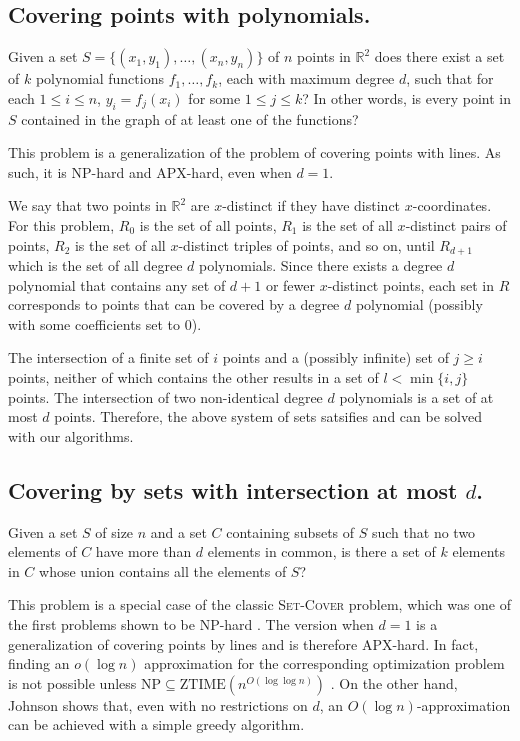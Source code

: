 \documentclass[ccfonts,lotsofwhite]{patmorin}
\begin{document}
\subsection{Covering points with polynomials.}

Given a set $S=\{(x_1,y_1),\ldots,(x_n,y_n)\}$ of $n$ points in
$\mathbb{R}^2$ does there exist a set of $k$ polynomial functions
$f_1,\ldots,f_k$, each with maximum degree $d$, such that for each
$1\le i\le n$, $y_i=f_j(x_i)$ for some $1\le j\le k$?  In other words,
is every point in $S$ contained in the graph of at least one of the
functions?

This problem is a generalization of the problem of covering points
with lines.  As such, it is NP-hard and APX-hard, even when $d=1$.

We say that two points in $\mathbb{R}^2$ are $x$-distinct if they have
distinct $x$-coordinates.  For this problem, $R_0$ is the set of all
points, $R_1$ is the set of all $x$-distinct pairs of points, $R_2$ is
the set of all $x$-distinct triples of points, and so on, until
$R_{d+1}$ which is the set of all degree $d$ polynomials.  Since there
exists a degree $d$ polynomial that contains any set of $d+1$ or fewer
$x$-distinct points, each set in $R$ corresponds to points that can be
covered by a degree $d$ polynomial (possibly with some coefficients
set to 0).

The intersection of a finite set of $i$ points and a (possibly
infinite) set of $j\ge i$ points, neither of which contains the other
results in a set of $l<\min\{i,j\}$ points.  The intersection of two
non-identical degree $d$ polynomials is a set of at most $d$ points.
Therefore, the above system of sets satsifies 
and can be solved with our algorithms.

\subsection{Covering by sets with intersection at most $d$.}

Given a set $S$ of size $n$ and a set $C$ containing subsets of $S$
such that no two elements of $C$ have more than $d$ elements in
common, is there a set of $k$ elements in $C$ whose union contains all
the elements of $S$?

This problem is a special case of the classic \textsc{Set-Cover}
problem, which was one of the first problems shown to be NP-hard
\cite{k72}.  The version when $d=1$ is a generalization of covering
points by lines and is therefore APX-hard.  In fact, finding an
$o(\log n)$ approximation for the corresponding optimization problem
is not possible unless
$\mathrm{NP}\subseteq\mathrm{ZTIME}(n^{O(\log\log n)})$ \cite{kar00}.
On the other hand, Johnson \cite{j74} shows that, even with no
restrictions on $d$, an $O(\log n)$-approximation can be achieved with
a simple greedy algorithm.
\end{document}
